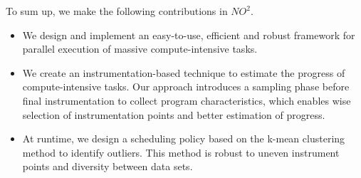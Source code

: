 To sum up, we make the following contributions in $NO^2$.
\begin{itemize}
\item We design and implement an easy-to-use, efficient and robust framework for parallel execution of massive compute-intensive tasks.
\item We create an instrumentation-based technique to estimate the progress of compute-intensive tasks. Our approach introduces a sampling phase before final instrumentation to collect program characteristics, which enables wise selection of instrumentation points and better estimation of progress.
\item At runtime, we design a scheduling policy based on the k-mean clustering method to identify outliers. This method is robust to uneven instrument points and diversity between data sets.
\end{itemize}

